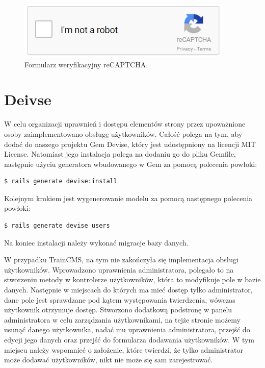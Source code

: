 \documentclass[openright]{xmgr}
\begin{document}
\begin{figure}[!tbh]
\centering
\includegraphics[width=.6\linewidth]{fig/captcha}
\caption{Formularz weryfikacyjny reCAPTCHA.}
\end{figure}

\newpage

\section{Deivse}
W celu organizacji uprawnień i dostępu elementów strony przez upoważnione osoby zaimplementowano obsługę użytkowników. Całość polega na tym, aby dodać do naszego projektu Gem Devise\cite{devise}, który jest udostępniony na licencji MIT License. Natomiast jego instalacja polega na dodaniu go do pliku Gemfile, następnie użyciu generatora wbudowanego w Gem za pomocą polecenia powłoki: 
\begin{lstlisting}[language=bash, caption={Polecenie instalujące Gem Devise w naszym projekcie}]
$ rails generate devise:install
\end{lstlisting}
Kolejnym krokiem jest wygenerowanie modelu za pomocą następnego polecenia powłoki: 
\begin{lstlisting}[language=bash, caption={Polecenie generujące modeul użytkowników w naszym projekcie}]
$ rails generate devise users
\end{lstlisting}
Na koniec instalacji należy wykonać migracje bazy danych.

W przypadku TrainCMS, na tym nie zakończyła się implementacja obsługi użytkowników. Wprowadzono uprawnienia administratora, polegało to na stworzeniu metody w kontrolerze użytkowników, która to modyfikuje pole w bazie danych. Następnie w miejscach do których ma mieć dostęp tylko administrator, dane pole jest sprawdzane pod kątem występowania twierdzenia, wówczas użytkownik otrzymuje dostęp. Stworzono dodatkową podstronę w panelu administratora w celu zarządzania użytkownikami, na tejże stronie możemy usunąć danego użytkownika, nadać mu uprawnienia administratora, przejść do edycji jego danych oraz przejść do formularza dodawania użytkowników. W tym miejscu należy wspomnieć o założenie, które twierdzi, że tylko administrator może dodawać użytkowników, nikt nie może się sam zarejestrować.
\end{document}
